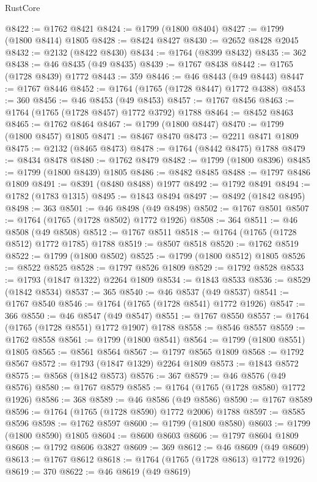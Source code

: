 \begin{lexlean}{RustCore}
\begin{coremodule}
@8422 := @1762 @8421
@8424 := @1799 (@1800 @8404)
@8427 := @1799 (@1800 @8414) @1805
@8428 := @8424 @8427
@8430 := @2652 @8428 @2045
@8432 := @2132 (@8422 @8430)
@8434 := @1764 (@8399 @8432)
@8435 := 362
@8438 := @46 @8435 (@49 @8435)
@8439 := @1767 @8438
@8442 := @1765 (@1728 @8439) @1772
@8443 := 359
@8446 := @46 @8443 (@49 @8443)
@8447 := @1767 @8446
@8452 := @1764 (@1765 (@1728 @8447) @1772 @4388)
@8453 := 360
@8456 := @46 @8453 (@49 @8453)
@8457 := @1767 @8456
@8463 := @1764 (@1765 (@1728 @8457) @1772 @3792) @1788
@8464 := @8452 @8463
@8465 := @1762 @8464
@8467 := @1799 (@1800 @8447)
@8470 := @1799 (@1800 @8457) @1805
@8471 := @8467 @8470
@8473 := @2211 @8471 @1809
@8475 := @2132 (@8465 @8473)
@8478 := @1764 (@8442 @8475) @1788
@8479 := @8434 @8478
@8480 := @1762 @8479
@8482 := @1799 (@1800 @8396)
@8485 := @1799 (@1800 @8439) @1805
@8486 := @8482 @8485
@8488 := @1797 @8486 @1809
@8491 := @8391 (@8480 @8488) @1977
@8492 := @1792 @8491
@8494 := @1782 (@1783 @1315)
@8495 := @1843 @8494
@8497 := @8492 (@1842 @8495)
@8498 := 363
@8501 := @46 @8498 (@49 @8498)
@8502 := @1767 @8501
@8507 := @1764 (@1765 (@1728 @8502) @1772 @1926)
@8508 := 364
@8511 := @46 @8508 (@49 @8508)
@8512 := @1767 @8511
@8518 := @1764 (@1765 (@1728 @8512) @1772 @1785) @1788
@8519 := @8507 @8518
@8520 := @1762 @8519
@8522 := @1799 (@1800 @8502)
@8525 := @1799 (@1800 @8512) @1805
@8526 := @8522 @8525
@8528 := @1797 @8526 @1809
@8529 := @1792 @8528
@8533 := @1793 (@1847 @1322) @2264 @1809
@8534 := @1843 @8533
@8536 := @8529 (@1842 @8534)
@8537 := 365
@8540 := @46 @8537 (@49 @8537)
@8541 := @1767 @8540
@8546 := @1764 (@1765 (@1728 @8541) @1772 @1926)
@8547 := 366
@8550 := @46 @8547 (@49 @8547)
@8551 := @1767 @8550
@8557 := @1764 (@1765 (@1728 @8551) @1772 @1907) @1788
@8558 := @8546 @8557
@8559 := @1762 @8558
@8561 := @1799 (@1800 @8541)
@8564 := @1799 (@1800 @8551) @1805
@8565 := @8561 @8564
@8567 := @1797 @8565 @1809
@8568 := @1792 @8567
@8572 := @1793 (@1847 @1329) @2264 @1809
@8573 := @1843 @8572
@8575 := @8568 (@1842 @8573)
@8576 := 367
@8579 := @46 @8576 (@49 @8576)
@8580 := @1767 @8579
@8585 := @1764 (@1765 (@1728 @8580) @1772 @1926)
@8586 := 368
@8589 := @46 @8586 (@49 @8586)
@8590 := @1767 @8589
@8596 := @1764 (@1765 (@1728 @8590) @1772 @2006) @1788
@8597 := @8585 @8596
@8598 := @1762 @8597
@8600 := @1799 (@1800 @8580)
@8603 := @1799 (@1800 @8590) @1805
@8604 := @8600 @8603
@8606 := @1797 @8604 @1809
@8608 := @1792 @8606 @3827
@8609 := 369
@8612 := @46 @8609 (@49 @8609)
@8613 := @1767 @8612
@8618 := @1764 (@1765 (@1728 @8613) @1772 @1926)
@8619 := 370
@8622 := @46 @8619 (@49 @8619)

\end{coremodule}
\end{lexlean}

